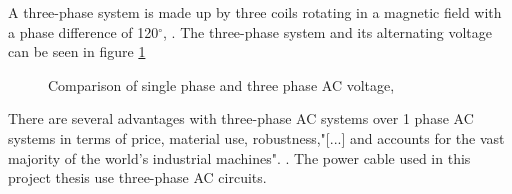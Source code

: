 \noindent A three-phase system is made up by three coils rotating in a magnetic field with a phase difference of 120$^{\circ}$, \cite{Dale2000}. The three-phase system and its alternating voltage can be seen in figure \ref{fig:volt} 

\begin{figure}[H]
\hfill
{}\hfill
\caption[$\; \:$Comparison of single phase and three phase AC voltage]{Comparison of single phase and three phase AC voltage, \cite{Dale2000}}
\label{fig:volt}
\end{figure}

\noindent There are several advantages with three-phase AC systems over 1 phase AC systems in terms of price, material use, robustness,"[...] and accounts for the vast majority of the world's industrial machines". \cite{1995Tac}. The power cable used in this project thesis use three-phase AC circuits. 
 


